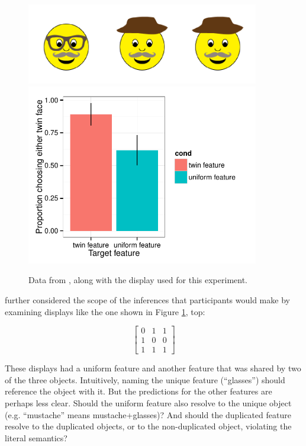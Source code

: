  \begin{figure}[t]
  \centering
  \includegraphics[width=4in]{figures/levels-twins-stim.pdf}
  \includegraphics[width=4in]{../plots/3-levels-twins.pdf}
  \caption{\label{fig:levels-twins} Data from , along with the display used for this experiment.}
\end{figure}

 further considered the scope of the inferences that participants would make by examining displays like the one shown in Figure \ref{fig:levels-twins}, top:

\begin{equation}
\left[
    \begin{array}{ccc}
      0 & 1 & 1 \\
      1 & 0 & 0\\
      1 & 1 & 1 
    \end{array} 
  \right]
\end{equation}

\noindent These displays had a uniform feature and another feature that was shared by two of the three objects. Intuitively, naming the unique feature (``glasses'') should reference the object with it. But the predictions for the other features are perhaps less clear. Should the uniform feature also resolve to the unique object (e.g. ``mustache'' means {\sc mustache+glasses})? And should the duplicated feature resolve to the duplicated objects, or to the non-duplicated object, violating the literal semantics? 

